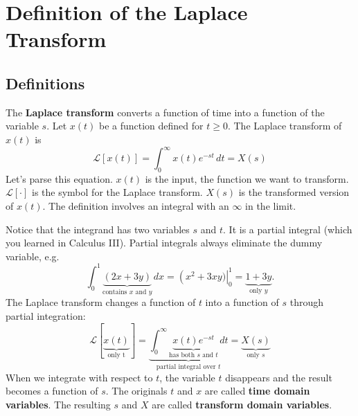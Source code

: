 \documentclass[10pt,letterpaper]{article}
\begin{document}

\section{Definition of the Laplace Transform}


\subsection{Definitions}
The \textbf{Laplace transform} converts a function of time into a function of the variable $s$. Let $x(t)$ be a function defined for $t \ge 0$. The Laplace transform of $x(t)$ is
\[
\boxed{
\mathcal{L}[x(t)] =  \int_0^\infty x(t)e^{-st}\,dt = X(s)
}
\]
Let's parse this equation. $x(t)$ is the input, the function we want to transform. $\mathcal{L}[\cdot]$ is the symbol for the Laplace transform. $X(s)$ is the transformed version of $x(t)$. The definition involves an integral with an $\infty$ in the limit. 

Notice that the integrand has two variables $s$ and $t$. It is a partial integral (which you learned in Calculus III). Partial integrals always eliminate the dummy variable, e.g.
$$
\int_0^1 \underbrace{(2x +3y)}_{\text{contains }x\text{ and }y}\,dx=\left(x^2+3xy)\right|_0^1 = \underbrace{1+3y}_{\text{only } y}.
$$
The Laplace transform changes a function of $t$ into a function of $s$ through partial integration:
\[
\mathcal{L}[\underbrace{x(t)}_{\text{only t}}] =  \underbrace{\int_0^\infty \underbrace{x(t)e^{-st}}_{\text{has both $s$ and $t$} }\,dt}_{\text{partial integral over }t} = \underbrace{X(s)}_{\text{only }s}
\]
When we integrate with respect to $t$, the variable $t$ disappears and the result becomes a function of $s$. The originals $t$ and $x$ are called \textbf{time domain variables}. The resulting $s$ and $X$ are called \textbf{transform domain variables}. 

\end{document}
